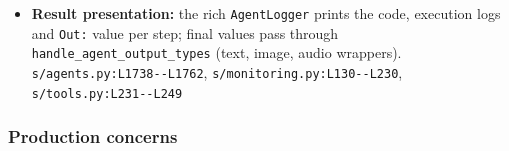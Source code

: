 \begin{itemize}
\item \textbf{Result presentation:} the rich \texttt{AgentLogger} prints the code, execution logs and \texttt{Out:\allowbreak{}} value per step; final values pass through \texttt{handle\_\allowbreak{}agent\_\allowbreak{}output\_\allowbreak{}types} (text, image, audio wrappers). \texttt{s/\allowbreak{}agents.\allowbreak{}py:\allowbreak{}L1738-\allowbreak{}-\allowbreak{}L1762}, \texttt{s/\allowbreak{}monitoring.\allowbreak{}py:\allowbreak{}L130-\allowbreak{}-\allowbreak{}L230}, \texttt{s/\allowbreak{}tools.\allowbreak{}py:\allowbreak{}L231-\allowbreak{}-\allowbreak{}L249}
\end{itemize}

\subsubsection*{Production concerns}
